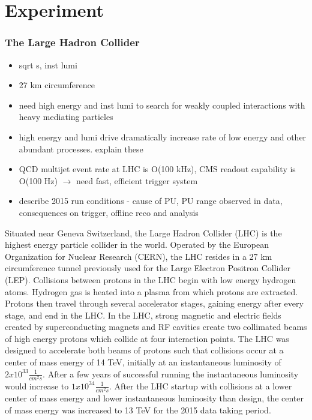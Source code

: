 \chapter{Experiment}
\label{experiment_chapter}
\subsection{The Large Hadron Collider}
\begin{itemize}
	\item sqrt s, inst lumi
	\item 27 km circumference
	\item need high energy and inst lumi to search for weakly coupled interactions with heavy mediating particles
	\item high energy and lumi drive dramatically increase rate of low energy and other abundant processes. explain these
	\item QCD multijet event rate at LHC is O(100 kHz), CMS readout capability is O(100 Hz) $\rightarrow$ need fast, efficient trigger system
	\item describe 2015 run conditions - cause of PU, PU range observed in data, consequences on trigger, offline reco and analysis
\end{itemize}
Situated near Geneva Switzerland, the Large Hadron Collider (LHC) is the highest energy particle
collider in the world.  Operated by the European Organization for Nuclear Research (CERN), the LHC resides in
a 27 km circumference tunnel previously used for the Large Electron Positron Collider (LEP).  Collisions between
protons in the LHC begin with low energy hydrogen atoms.  Hydrogen gas is heated into a plasma from which protons are
extracted.  Protons then travel through several accelerator stages, gaining energy after every stage, and end in
the LHC.  In the LHC, strong magnetic and electric fields created by superconducting magnets and RF cavities 
create two collimated beams of high energy protons which collide at four interaction points.  The LHC was
designed to accelerate both beams of protons such that collisions occur at a center of mass energy of 14 TeV,
initially at an instantaneous luminosity of $2x10^{33} \frac{1}{cm^{2}s}$.  After a few years of successful running
the instantaneous luminosity would increase to $1x10^{34} \frac{1}{cm^{2}s}$.
After the LHC startup with collisions at a lower center of mass energy and lower instantaneous luminosity than design, the center of mass
energy was increased to 13 TeV for the 2015 data taking period.



